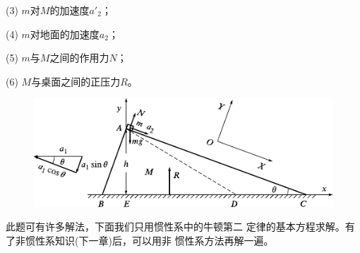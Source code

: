 (3) $ m $对$ M $的加速度$ a'_2 $；

(4) $ m $对地面的加速度$ a_2$；

\clearpage
(5) $ m $与$ M  $之间的作用力$  N $；

(6) $ M $与桌面之间的正压力$ R $。
\begin{figure}[h]
  \centering
  \includegraphics{figure/fig03.16}
  \caption{}
  \label{fig:03.16}
\end{figure}

\solution 此题可有许多解法，下面我们只用惯性系中的牛顿第二
定律的基本方程求解。有了非惯性系知识(下一章)后，可以用非
惯性系方法再解一遍。

